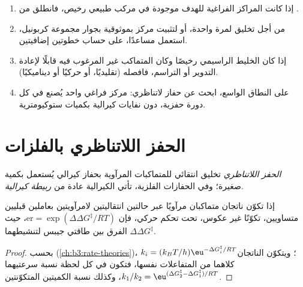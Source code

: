 \begin{method}\label{met:b3:asymmetric-synthesis:strategy}
\begin{enumerate}
  \item إذا كانت المراكز الفراغية للهدف موجودة في مركب طبيعي رخيص، فانطلق
        من .
  \item من أجل تخليق لمرة واحدة، أو لتثبيت مركز بموثوقية بجوار مجموعة
        كربونيل، استعمل مساعدًا، على حساب خطوتين إضافيتين.
  \item إذا كان الخليط الراسيمي رخيصًا وكان المتماكب غير المرغوب فيه قابلًا لإعادة التدوير أو
        التراسم، فافصله (تقليديًا، أو حركيًا أو ديناميكيًا).
  \item على النطاق الواسع، ابحث عن حفاز لاتناظري: مركز فراغي واحد يُصنع
        في كل دورة حفزية، دون نفايات كيرالية بكميات ستوكيومترية.
\end{enumerate}
\end{method}

\section{الحفز اللاتناظري بالفلزات}

\begin{definition}\label{def:b3:asymmetric-synthesis:asymmetric-catalysis}
\emph{الحفز اللاتناظري} تخليق انتقائي للمتماكبات المرآوية
بحفاز كيرالي يُستعمل بكمية صغيرة؛ وفي الحفازات الفلزية، تأتي
الكيرالية عادة من \emph{ربيطة كيرالية}.
\end{definition}

\begin{theorem}\label{thm:b3:asymmetric-synthesis:er-ddg}
إذا تكوّن ناتجان متماكبان مرآويًا عبر حالتين انتقاليتين لامرآويتين
بعاملين قبليين متساويين، تكوّنًا غير عكوس، تحت تحكم حركي، فإن
$\mathrm{er} = \exp(\Delta\Delta G^\ddagger/RT)$، حيث $\Delta\Delta G^\ddagger$ الفرق بين طاقتي جيبس
لتنشيطهما.
\end{theorem}

\begin{proof}
بحسب  (\cref{ch:b3:rate-theories})،
$k_i = (k_BT/h)\eu^{-\Delta G_i^\ddagger/RT}$؛ ويتكوّن الناتجان كلاهما من المتفاعلات نفسها، فتكون في كل لحظة
نسبة سرعتيهما $k_1/k_2 = \eu^{(\Delta G_2^\ddagger - \Delta G_1^\ddagger)/RT}$، وكذلك نسبة الكميتين المتكوّنتين.
\end{proof}

